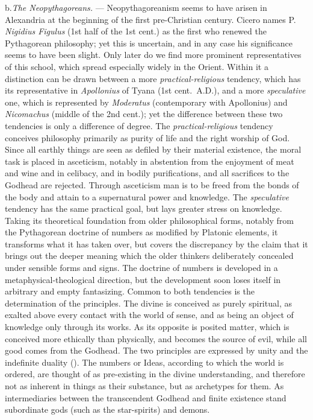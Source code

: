 b.\enspace \emph{The Neopythagoreans.} --- Neopythagoreanism seems to
have arisen in Alexandria at the beginning of the first pre-Christian century. Cicero names P. \emph{Nigidius Figulus} (1st half of the 1st cent.) as the first who renewed the
Pythagorean philosophy; yet this is uncertain, and in any
case his significance seems to have been slight. Only
later do we find more prominent representatives of this
school, which spread especially widely in the Orient. Within it
a distinction can be drawn between a more \emph{practical-religious} tendency, which has its representative in \emph{Apollonius} of Tyana
(1st cent.\ A.D.), and a more \emph{speculative} one, which is represented by \emph{Moderatus} (contemporary with Apollonius) and \emph{Nicomachus} (middle of the 2nd cent.); yet the difference between
these two tendencies is only a difference of degree. The \emph{practical-religious} tendency conceives philosophy primarily as purity of
life and the right worship of God. Since all earthly things
are seen as defiled by their material existence, the
moral task is placed in asceticism, notably in abstention from the enjoyment of meat and wine and in celibacy, and in bodily purifications,
and all sacrifices to the Godhead are rejected. Through asceticism
man is to be freed from the bonds of the body and attain to a supernatural power and knowledge. The \emph{speculative} tendency has the
same practical goal, but lays greater stress on knowledge.
Taking its theoretical foundation from older philosophical
forms, notably from the Pythagorean doctrine of numbers as modified by Platonic elements,
it transforms what it has taken over, but covers the
discrepancy by the claim that it brings out the deeper
meaning which the older thinkers deliberately concealed under sensible
forms and signs. The doctrine of numbers is developed in a metaphysical-theological direction,
but the development soon loses itself in arbitrary and empty fantasizing.
Common to both tendencies is the determination of the principles. The
divine is conceived as purely spiritual, as exalted above every
contact with the world of sense, and as being an object of
knowledge only through its works. As its opposite is posited
matter, which is conceived more ethically than physically, and becomes the source of
evil, while all good comes from the Godhead. The two principles
are expressed by unity and the indefinite duality ().
The numbers or Ideas, according to which the world is ordered, are thought of as
pre-existing in the divine understanding, and therefore not as inherent
in things as their substance, but as archetypes for them. As
intermediaries between the transcendent Godhead and finite existence
stand subordinate gods (such as the star-spirits) and demons.

